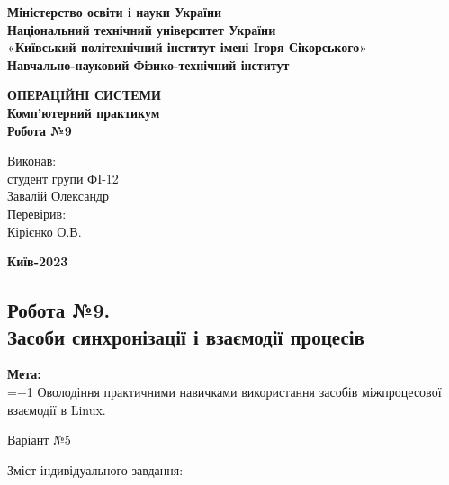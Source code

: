 \documentclass[a4paper,12pt]{article}
\begin{document}
    \pagestyle{fancy}
    \fancyhead{}
    \begin{center}
        \large{\textbf{Міністерство освіти і науки України\\
                Національний технічний університет України\\
                «Київський політехнічний інститут імені Ігоря Сікорського»\\
                Навчально-науковий Фізико-технічний інститут}}\\
        \hfill \break \hfill \break \hfill\break \hfill \break \hfill \break \hfill \break \hfill \break
        \hfill \break \hfill \break \hfill \break
        \begin{center}
            \normalsize{\textbf{ОПЕРАЦІЙНІ СИСТЕМИ\\
            Комп’ютерний практикум\\
            Робота №9}}
        \end{center}
    \end{center}
    \hfill \break \hfill \break \hfill \break \hfill \break \hfill \break \hfill \break \hfill \break
    \hfill \break \hfill \break \hfill \break \hfill \break 
    \begin{flushright}
        \large{ \hspace{35pt} Виконав:\\
            студент групи ФI-12\\
            Завалій Олександр\\} 
        \large{ \hspace{35pt} Перевірив:\\
        Кірієнко О.В.} 
    \end{flushright}
    \hfill \break \hfill \break \hfill \break \hfill \break \hfill \break \hfill \break \hfill \break
    \hfill \break
    \begin{center} \textbf{Київ-2023} \end{center}
    \thispagestyle{empty}

\newpage
    \begin{center}
        \section*{\bfseries{Робота №9.\\
        Засоби синхронізації і взаємодії процесів }}
    \end{center}
    \textbf{Мета:} \\
    \hangindent=1.5cm 
    \hangafter=+1 \noindent
    Оволодіння практичними навичками використання засобів міжпроцесової взаємодії в Linux. \\
    \begin{center}
        \Large{Варіант №5}
    \end{center}
    Зміст індивідуального завдання:
\end{document}
